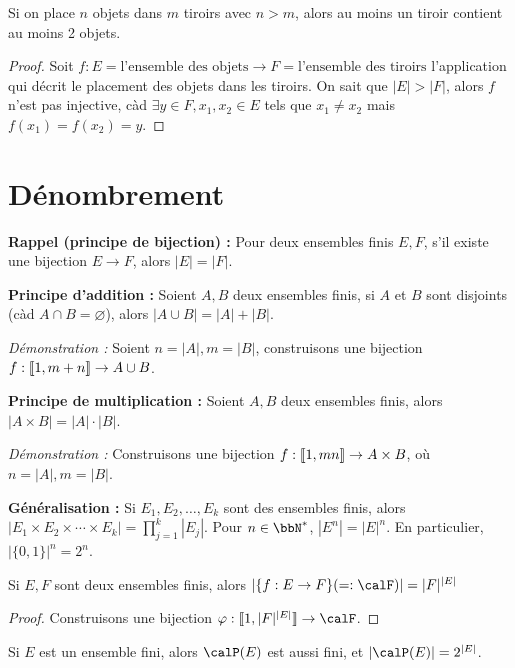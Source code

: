\begin{cor}
    Si on place $n$ objets dans $m$ tiroirs avec $n > m$, alors au moins un tiroir contient au moins 2 objets.
\end{cor}

\begin{proof}
    Soit $f: E = \text{l'ensemble des objets} \to F = \text{l'ensemble des tiroirs}$
    l'application qui décrit le placement des objets dans les tiroirs.
    On sait que $|E| > |F|$, alors $f$ n'est pas injective,
    càd $\exists y \in F, x_1, x_2 \in E$ tels que $x_1 \neq x_2$ mais $f(x_1)=f(x_2)=y$. \qedhere
\end{proof}

\section{Dénombrement}

\textbf{Rappel (principe de bijection) :}
Pour deux ensembles finis $E, F$, s'il existe une bijection $E \to F$, alors $|E| = |F|$.

\textbf{Principe d'addition :}
Soient $A, B$ deux ensembles finis, si $A$ et $B$ sont disjoints (càd $A \cap B = \varnothing$),
alors $|A \cup B| = |A| + |B|$.

\textit{Démonstration :} Soient $n = |A|, m = |B|$, construisons une bijection $f: \llbracket 1, m + n \rrbracket \to A \cup B$.

\textbf{Principe de multiplication :}
Soient $A, B$ deux ensembles finis, alors $|A \times B| = |A| \cdot |B|$.

\textit{Démonstration :} Construisons une bijection $f: \llbracket 1, mn \rrbracket \to A \times B$, où $n = |A|, m = |B|$.

\textbf{Généralisation :} Si $E_1, E_2, \ldots, E_k$ sont des ensembles finis,
alors $|E_1 \times E_2 \times \cdots \times E_k| = \prod\limits_{j = 1}^k |E_j|$.
Pour $n \in \bbN^*$, $|E^n| = |E|^n$.
En particulier, $| \{ 0, 1 \} |^n = 2^n$.

\begin{cor}
    Si $E, F$ sont deux ensembles finis, alors $| \{ f: E \to F \} (=: \calF) | = |F|^{|E|}$
\end{cor}

\begin{proof}
    Construisons une bijection $\varphi: \llb 1, |F|^{|E|} \rrb \to \calF$.
\end{proof}

\begin{cor}
    Si $E$ est un ensemble fini, alors $\calP(E)$ est aussi fini, et $|\calP(E)| = 2^{|E|}$.
\end{cor}

